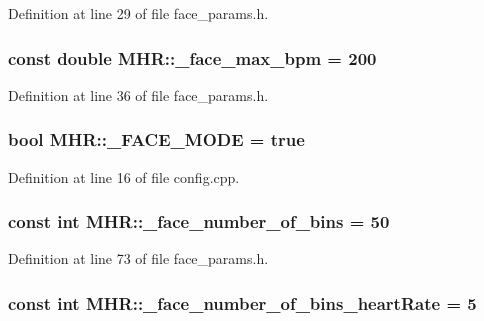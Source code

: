 Definition at line 29 of file face\+\_\+params.\+h.

\hypertarget{namespace_m_h_r_a123d7bba4eba9d4c49ebe21458394a9a}{
\subsubsection[{\+\_\+face\+\_\+max\+\_\+bpm}]{\setlength{\rightskip}{0pt plus 5cm}const double M\+H\+R\+::\+\_\+face\+\_\+max\+\_\+bpm = 200}}\label{namespace_m_h_r_a123d7bba4eba9d4c49ebe21458394a9a}


Definition at line 36 of file face\+\_\+params.\+h.

\hypertarget{namespace_m_h_r_a364268cdc7b75db63f89c9d8960aa1b4}{
\subsubsection[{\+\_\+\+F\+A\+C\+E\+\_\+\+M\+O\+D\+E}]{\setlength{\rightskip}{0pt plus 5cm}bool M\+H\+R\+::\+\_\+\+F\+A\+C\+E\+\_\+\+M\+O\+D\+E = true}}\label{namespace_m_h_r_a364268cdc7b75db63f89c9d8960aa1b4}


Definition at line 16 of file config.\+cpp.

\hypertarget{namespace_m_h_r_a2c4c769eba572cf1388059c68e02804a}{
\subsubsection[{\+\_\+face\+\_\+number\+\_\+of\+\_\+bins}]{\setlength{\rightskip}{0pt plus 5cm}const int M\+H\+R\+::\+\_\+face\+\_\+number\+\_\+of\+\_\+bins = 50}}\label{namespace_m_h_r_a2c4c769eba572cf1388059c68e02804a}


Definition at line 73 of file face\+\_\+params.\+h.

\hypertarget{namespace_m_h_r_abfcdcdfbf5694a70c871df5484e30321}{
\subsubsection[{\+\_\+face\+\_\+number\+\_\+of\+\_\+bins\+\_\+heart\+Rate}]{\setlength{\rightskip}{0pt plus 5cm}const int M\+H\+R\+::\+\_\+face\+\_\+number\+\_\+of\+\_\+bins\+\_\+heart\+Rate = 5}}\label{namespace_m_h_r_abfcdcdfbf5694a70c871df5484e30321}


